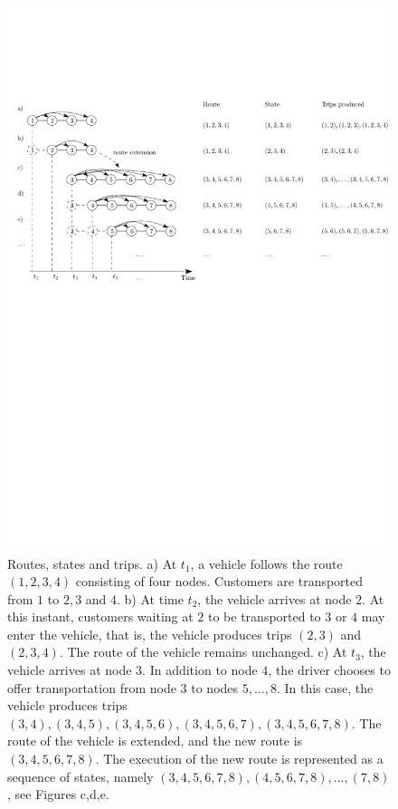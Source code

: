 \documentclass[dissertation,draft*]{aaltoseries}
\begin{document}
\begin{figure}[ht]
\begin{center}
\includegraphics[width=1.0\columnwidth]{esim01}
\caption{Routes, states and trips. a) At $t_1$, a vehicle follows the route $(1,2,3,4)$ consisting
of four nodes. Customers are transported from $1$ to $2,3$ and $4$. b) At time $t_2$, the 
vehicle arrives at node $2$. At this instant, customers waiting at $2$ to be transported to $3$ or $4$ may enter the vehicle, that is, the vehicle 
produces trips $(2,3)$ and $(2,3,4)$. The route of the vehicle remains unchanged. c)
At $t_3$, the vehicle arrives at node $3$. In addition to node $4$, the driver chooses to offer transportation from node $3$ to nodes 
$5,\ldots,8$. In this case, the vehicle produces trips $(3,4),(3,4,5),(3,4,5,6),(3,4,5,6,7),(3,4,5,6,7,8)$.
The route of the vehicle is extended, and the new route is $(3,4,5,6,7,8)$. The execution of the
new route is represented as a sequence of states, namely $(3,4,5,6,7,8), (4,5,6,7,8), \ldots, (7,8)$,
see Figures c,d,e.
}
\label{esim01}
\end{center}
\end{figure}
\end{document}

